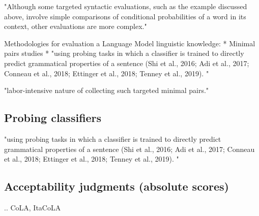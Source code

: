 
"Although some targeted syntactic evaluations, such as the example discussed above, involve simple comparisons of conditional probabilities of a word in its context, other evaluations are more complex." \citep{hu2020systematic}

Methodologies for evaluation a Language Model linguistic knowledge:
* Minimal pairs studies \citep{warstadt2020blimp, linzen2016assessing, marvin2018targeted, wilcox2018rnn}
* "using probing tasks in which a classifier is trained to directly predict grammatical properties of a sentence  (Shi et al., 2016; Adi et al., 2017; Conneau et al., 2018; Ettinger et al., 2018; Tenney et al., 2019). "  \citep{warstadt2020blimp}	




"labor-intensive nature of collecting such targeted minimal pairs." \citep{warstadt2020blimp}	





\subsection{Probing classifiers}

"using probing tasks in which a classifier is trained to directly predict grammatical properties of a sentence  (Shi et al., 2016; Adi et al.,
2017; Conneau et al., 2018; Ettinger et al., 2018;
Tenney et al., 2019). "  \citep{warstadt2020blimp}	


\subsection{Acceptability judgments (absolute scores)}
..
CoLA, ItaCoLA


